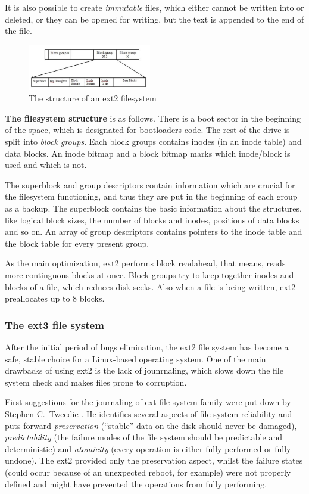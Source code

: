 \documentclass{acm_proc_article-sp}
\begin{document}
It is also possible to create {\it immutable} files, which either cannot be written into or deleted, or they can be opened for writing, but the text is appended to the end of the file.

\begin{figure}
\centering
\includegraphics[width=0.48\textwidth]{images/ext2structure.jpg}
	\caption{The structure of an ext2 filesystem \cite{ext2structure}}
\end{figure}

{\bf The filesystem structure} is as follows. There is a boot sector in the beginning of the space, which is designated for bootloaders code. The rest of the drive is split into {\it block groups}. Each block groups contains inodes (in an inode table) and data blocks. An inode bitmap and a block bitmap marks which inode/block is used and which is not. 

The superblock and group descriptors contain information which are crucial for the filesystem functioning, and thus they are put in the beginning of each group as a backup. The superblock contains the basic information about the structures, like logical block sizes, the number of blocks and inodes, positions of data blocks and so on. An array of group descriptors contains pointers to the inode table and the block table for every present group.

As the main optimization, ext2 performs block readahead, that means, reads more continguous blocks at once. Block groups try to keep together inodes and blocks of a file, which reduces disk seeks. Also when a file is being written, ext2 preallocates up to 8 blocks.

\subsubsection{The ext3 file system}

After the initial period of bugs elimination, the ext2 file system has become a safe, stable choice for a Linux-based operating system. One of the main drawbacks of using ext2 is the lack of jounrnaling, which slows down the file system check and makes files prone to corruption.

First suggestions for the journaling of ext file system family were put down by Stephen C.\ Tweedie \cite{extjournal}. He identifies several aspects of file system reliability and puts forward {\it preservation} (``stable'' data on the disk should never be damaged), {\it predictability} (the failure modes of the file system should be predictable and deterministic) and {\it atomicity} (every operation is either fully performed or fully undone). The ext2 provided only the preservation aspect, whilst the failure states (could occur because of an unexpected reboot, for example) were not properly defined and might have prevented the operations from fully performing.
\end{document}
